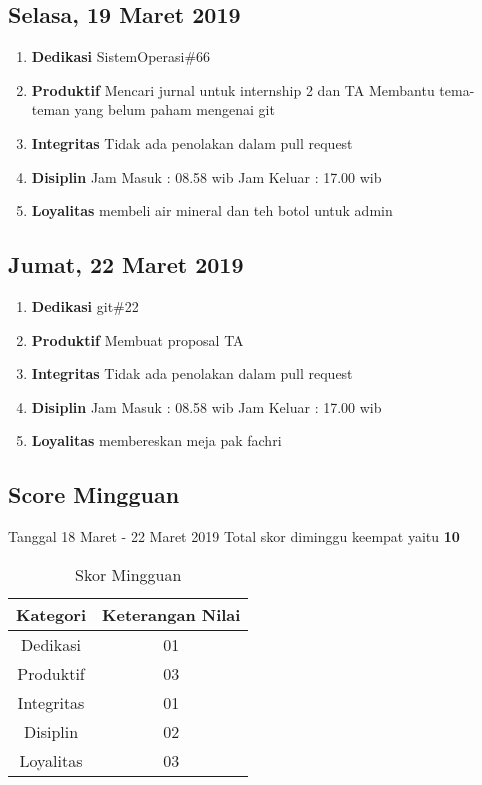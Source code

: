 \subsection{Selasa, 19 Maret 2019}
\begin{enumerate}
\item \textbf{Dedikasi}
\subitem SistemOperasi\#66
\item \textbf{Produktif}
\subitem Mencari jurnal untuk internship 2 dan TA
\subitem Membantu tema-teman yang belum paham mengenai git
\item \textbf{Integritas}
\subitem Tidak ada penolakan dalam pull request
\item \textbf{Disiplin}
\subitem Jam Masuk : 08.58 wib
\subitem Jam Keluar : 17.00 wib
\item \textbf{Loyalitas}
\subitem membeli air mineral dan teh botol untuk admin
\end{enumerate}

\subsection{Jumat, 22 Maret 2019}
\begin{enumerate}
\item \textbf{Dedikasi}
\subitem git\#22
\item \textbf{Produktif}
\subitem Membuat proposal TA
\item \textbf{Integritas}
\subitem Tidak ada penolakan dalam pull request
\item \textbf{Disiplin}
\subitem Jam Masuk : 08.58 wib
\subitem Jam Keluar : 17.00 wib
\item \textbf{Loyalitas}
\subitem membereskan meja pak fachri
\end{enumerate}

\subsection{Score Mingguan} 
Tanggal 18 Maret - 22 Maret 2019 Total skor diminggu keempat yaitu \textbf{10}

\begin{table}[h]
\caption{Skor Mingguan}
\centering
\begin{tabular}{|c|c|}
\hline
\textbf{Kategori}&\textbf{Keterangan Nilai}\\
\hline
Dedikasi&01\\
\hline
Produktif&03\\
\hline
Integritas&01\\
\hline
Disiplin&02\\
\hline
Loyalitas&03\\
\hline
\end{tabular}
\label{table : skor minggu keempat}
\end{table}